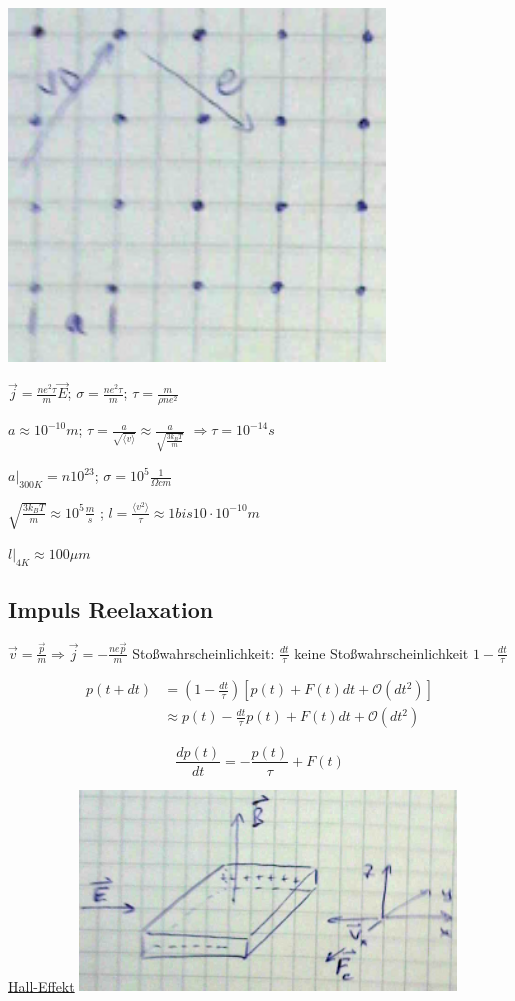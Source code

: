 \includegraphics[width=0.75\textwidth]{kap06_18.png}

\(\vec j = \frac{ne^2\tau}{m}\vec E\); \(\sigma = \frac{ne^2\tau}{m}\); \(\tau = \frac{m}{\rho n e^2}\)


\(a\approx 10^{-10}m\); \(\tau = \frac{a}{\sqrt{\langle v\rangle }}\approx \frac{a}{\sqrt{\frac{3k_BT}{m}}}\)
\(\Rightarrow \tau = 10^{-14}s\)

\(\left. a\right|_{300K} = n 10^{23}\); \(\sigma = 10^{5}\frac{1}{\Omega cm}\)

\(\sqrt{\frac{3k_BT}{m}}\approx 10^5\frac{m}{s}\) ; \(l=\frac{\langle v^2\rangle }{\tau}\approx 1 bis 10\cdot 10^{-10}m\)

\(\left. l \right|_{4K}\approx 100\mu m\)

\subsection{Impuls Reelaxation}

\(\vec v = \frac{\vec p}{m} \Rightarrow \vec j = -\frac{ne\vec p}{m}\) Stoßwahrscheinlichkeit: \(\frac{dt}{\tau}\)
keine Stoßwahrscheinlichkeit \(1-\frac{dt}{\tau}\)


\begin{align}
p(t+dt) &= (1-\frac{dt}{\tau})[p(t) + F(t)dt+\mathcal O(dt^2)]\\
&\approx p(t) -\frac{dt}{\tau}p(t) + F(t)dt+\mathcal O(dt^2)
\end{align}

\[\boxed{\frac{dp(t)}{dt}=-\frac{p(t)}{\tau}+F(t)}\]


\underline{Hall-Effekt}
\includegraphics[width=0.75\textwidth]{kap06_19.png}

